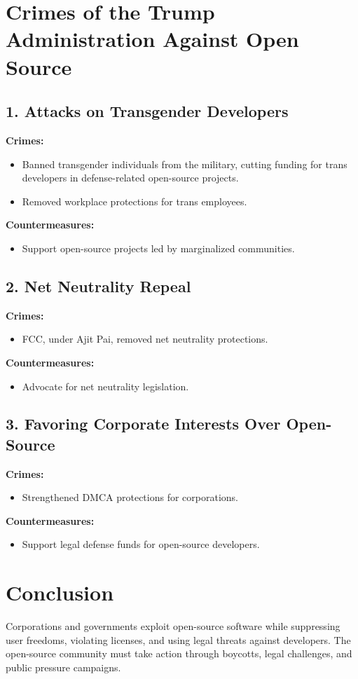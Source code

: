 \documentclass[12pt]{article}
\begin{document}
\newpage
\section{Crimes of the Trump Administration Against Open Source}

\subsection{1. Attacks on Transgender Developers}
\textbf{Crimes:}
\begin{itemize}
    \item Banned transgender individuals from the military, cutting funding for trans developers in defense-related open-source projects.
    \item Removed workplace protections for trans employees.
\end{itemize}

\textbf{Countermeasures:}
\begin{itemize}
    \item Support open-source projects led by marginalized communities.
\end{itemize}

\subsection{2. Net Neutrality Repeal}
\textbf{Crimes:}
\begin{itemize}
    \item FCC, under Ajit Pai, removed net neutrality protections.
\end{itemize}

\textbf{Countermeasures:}
\begin{itemize}
    \item Advocate for net neutrality legislation.
\end{itemize}

\subsection{3. Favoring Corporate Interests Over Open-Source}
\textbf{Crimes:}
\begin{itemize}
    \item Strengthened DMCA protections for corporations.
\end{itemize}

\textbf{Countermeasures:}
\begin{itemize}
    \item Support legal defense funds for open-source developers.
\end{itemize}

\section{Conclusion}
Corporations and governments exploit open-source software while suppressing user freedoms, violating licenses, and using legal threats against developers. The open-source community must take action through boycotts, legal challenges, and public pressure campaigns.
\end{document}
